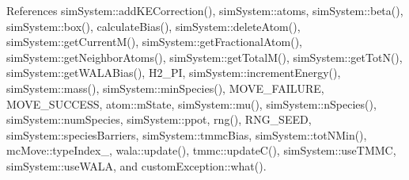 References sim\-System\-::add\-K\-E\-Correction(), sim\-System\-::atoms, sim\-System\-::beta(), sim\-System\-::box(), calculate\-Bias(), sim\-System\-::delete\-Atom(), sim\-System\-::get\-Current\-M(), sim\-System\-::get\-Fractional\-Atom(), sim\-System\-::get\-Neighbor\-Atoms(), sim\-System\-::get\-Total\-M(), sim\-System\-::get\-Tot\-N(), sim\-System\-::get\-W\-A\-L\-A\-Bias(), H2\-\_\-P\-I, sim\-System\-::increment\-Energy(), sim\-System\-::mass(), sim\-System\-::min\-Species(), M\-O\-V\-E\-\_\-\-F\-A\-I\-L\-U\-R\-E, M\-O\-V\-E\-\_\-\-S\-U\-C\-C\-E\-S\-S, atom\-::m\-State, sim\-System\-::mu(), sim\-System\-::n\-Species(), sim\-System\-::num\-Species, sim\-System\-::ppot, rng(), R\-N\-G\-\_\-\-S\-E\-E\-D, sim\-System\-::species\-Barriers, sim\-System\-::tmmc\-Bias, sim\-System\-::tot\-N\-Min(), mc\-Move\-::type\-Index\-\_\-, wala\-::update(), tmmc\-::update\-C(), sim\-System\-::use\-T\-M\-M\-C, sim\-System\-::use\-W\-A\-L\-A, and custom\-Exception\-::what().


